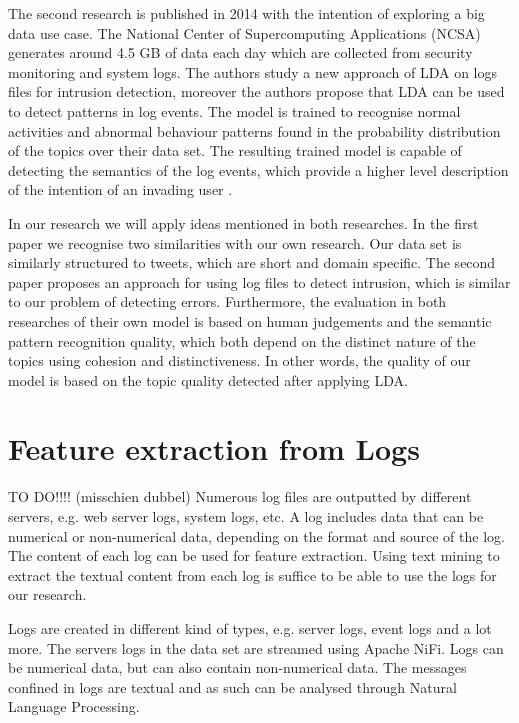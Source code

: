 The second research is published in 2014 with the intention of exploring a big data use case. The National Center of Supercomputing Applications (NCSA) generates around 4.5 GB of data each day which are collected from security monitoring and system logs. The authors study a new approach of LDA on logs files for intrusion detection, moreover the authors propose that LDA can be used to detect patterns in log events. The model is trained to recognise normal activities and abnormal behaviour patterns found in the probability distribution of the topics over their data set. The resulting trained model is capable of detecting the semantics of the log events, which provide a higher level description of the intention of an invading user \cite{Jingwei2014KnowledgeLDA}. 

In our research we will apply ideas mentioned in both researches. In the first paper we recognise two similarities with our own research. Our data set is similarly structured to tweets, which are short and domain specific. The second paper proposes an approach for using log files to detect intrusion, which is similar to our problem of detecting errors. Furthermore, the evaluation in both researches of their own model is based on human judgements and the semantic pattern recognition quality, which both depend on the distinct nature of the topics using cohesion and distinctiveness. In other words, the quality of our model is based on the topic quality detected after applying LDA.

\begin{comment}
The domain specific nature of our research is also explored in the second research paper.
\end{comment}

\section{Feature extraction from Logs}\label{theory:featureextraction}
TO DO!!!! (misschien dubbel)
Numerous log files are outputted by different servers, e.g. web server logs, system logs, etc. A log includes data that can be numerical or non-numerical data, depending on the format and source of the log. The content of each log can be used for feature extraction. Using text mining to extract the textual content from each log is suffice to be able to use the logs for our research.

Logs are created in different kind of types, e.g. server logs, event logs and a lot more. The servers logs in the data set are streamed using Apache NiFi. Logs can be numerical data, but can also contain non-numerical data. The messages confined in logs are textual and as such can be analysed through Natural Language Processing. 

